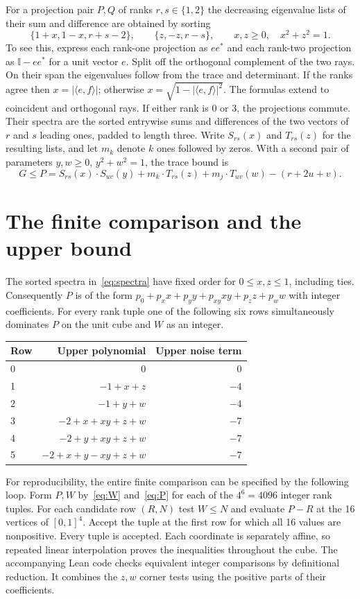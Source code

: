 \documentclass[11pt]{article}
\newcommand{\id}{\mathbb I}
\begin{document}
For a projection pair $P,Q$ of ranks $r,s\in\{1,2\}$ the decreasing eigenvalue lists of their sum and difference are obtained by sorting
\begin{equation}
 \{1+x,1-x,r+s-2\},\qquad \{z,-z,r-s\},
 \qquad x,z\ge0,\quad x^2+z^2=1.                                  \label{eq:spectra}
\end{equation}
To see this, express each rank-one projection as $ee^*$ and each rank-two projection as $\id-ee^*$ for a unit vector $e$. Split off the orthogonal complement of the two rays. On their span the eigenvalues follow from the trace and determinant. If the ranks agree then $x=|\langle e,f\rangle|$; otherwise $x=\sqrt{1-|\langle e,f\rangle|^2}$. The formulas extend to coincident and orthogonal rays. If either rank is 0 or 3, the projections commute. Their spectra are the sorted entrywise sums and differences of the two vectors of $r$ and $s$ leading ones, padded to length three. Write $S_{rs}(x)$ and $T_{rs}(z)$ for the resulting lists, and let $m_k$ denote $k$ ones followed by zeros. With a second pair of parameters $y,w\ge0$, $y^2+w^2=1$, the trace bound is
\begin{equation}
 G\le P=S_{rs}(x)\cdot S_{uv}(y)+m_k\cdot T_{rs}(z)
              +m_j\cdot T_{uv}(w)-(r+2u+v).                         \label{eq:P}
\end{equation}

\section{The finite comparison and the upper bound}
The sorted spectra in~\eqref{eq:spectra} have fixed order for $0\le x,z\le1$, including ties. Consequently $P$ is of the form
$p_0+p_x x+p_y y+p_{xy}xy+p_z z+p_w w$ with integer coefficients. For every rank tuple one of the following six rows simultaneously dominates $P$ on the unit cube and $W$ as an integer.
\begin{center}
\begin{tabular}{@{}lrr@{}}
\toprule
Row & Upper polynomial & Upper noise term\\
\midrule
0 & $0$ & $0$\\
1 & $-1+x+z$ & $-4$\\
2 & $-1+y+w$ & $-4$\\
3 & $-2+x+xy+z+w$ & $-7$\\
4 & $-2+y+xy+z+w$ & $-7$\\
5 & $-2+x+y-xy+z+w$ & $-7$\\
\bottomrule
\end{tabular}
\end{center}
For reproducibility, the entire finite comparison can be specified by the following loop. Form $P,W$ by~\eqref{eq:W} and~\eqref{eq:P} for each of the $4^6=4096$ integer rank tuples. For each candidate row $(R,N)$ test $W\le N$ and evaluate $P-R$ at the 16 vertices of $[0,1]^4$. Accept the tuple at the first row for which all 16 values are nonpositive. Every tuple is accepted. Each coordinate is separately affine, so repeated linear interpolation proves the inequalities throughout the cube. The accompanying Lean code checks equivalent integer comparisons by definitional reduction. It combines the $z,w$ corner tests using the positive parts of their coefficients.
\end{document}
